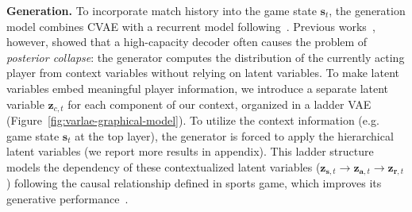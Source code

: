 \documentclass[letterpaper]{article} %
\newcommand{\context}{c}
\newcommand{\latentvariables}{\mathbf{z}}
\newcommand{\state}{\mathbf{s}}
\newcommand{\action}{\mathbf{a}}
\newcommand{\reward}{\boldsymbol{r}}
\begin{document}
{\bf Generation.}
To incorporate match history into the game state $\state_t$, the generation model combines CVAE with a recurrent model following~\cite{ChungKDGCB15}. Previous works~\cite{HePosteriorCollapse19,ZhuBNVAE2020}, however, showed that a high-capacity decoder 
often causes the problem of {\it posterior collapse}: 
the generator computes the distribution of the currently acting player from context variables without relying on latent variables. To make latent variables embed meaningful player information, we introduce a separate latent variable $\latentvariables_{\context,t}$ for each component of our context, organized in a ladder VAE~\cite{SonderbyLadderVAE16} (Figure~\ref{fig:varlae-graphical-model}). To utilize the context information (e.g. game state $\state_{t}$ at the top layer), the generator is forced to apply the hierarchical latent variables (we report more results in appendix). 
This ladder structure models the dependency of these contextualized latent variables  ($\latentvariables_{\state,t}\rightarrow \latentvariables_{\action,t}\rightarrow \latentvariables_{\reward,t}$) following the causal relationship defined in sports game, which improves its generative performance~\cite{SonderbyLadderVAE16}.
\end{document}
